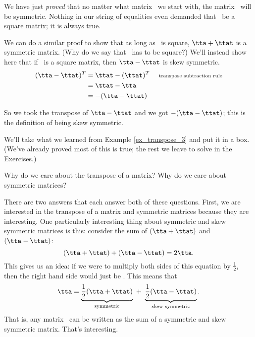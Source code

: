 We have just \textit{proved} that no matter what matrix \tta\ we start with, the matrix \tta\ttat\ will be symmetric. Nothing in our string of equalities even demanded that \tta\ be a square matrix; it is always true. 

We can do a similar proof to show that as long as \tta\ is square, $\tta+\ttat$ is a symmetric matrix. (Why do we say that \tta\ has to be square?) We'll instead show here that if \tta\ is a square matrix, then $\tta-\ttat$ is skew symmetric.
\begin{align*} 
(\tta-\ttat)^T &= \ttat - (\ttat)^T	\quad\ \text{\scriptsize transpose subtraction rule} \\
		&= \ttat - \tta \\
		&= -(\tta - \ttat)
\end{align*}

So we took the transpose of $\tta - \ttat$ and we got $-(\tta-\ttat)$; this is the definition of being skew symmetric.

We'll take what we learned from Example \ref{ex_transpose_3} and put it in a box. (We've already proved most of this is true; the rest we leave to solve in the Exercises.)

\smallskip


\smallskip
	
Why do we care about the transpose of a matrix? Why do we care about symmetric matrices?

There are two answers that each answer both of these questions. First, we are interested in the transpose of a matrix and symmetric matrices because they are interesting. One particularly interesting thing about symmetric and skew symmetric matrices is this: consider the sum of $(\tta+\ttat)$ and $(\tta-\ttat)$:
\[
(\tta+\ttat)+(\tta-\ttat) = 2\tta.
\]
This gives us an idea: if we were to multiply both sides of this equation by $\frac12$, then the right hand side would just be \tta. This means that 
\[
\tta = \underbrace{\frac12(\tta+\ttat)}_{\text{\centering \scriptsize symmetric}}\ +\ \underbrace{\frac12(\tta-\ttat)}_{\text{\centering\scriptsize skew symmetric}}.
\]
That is, any matrix \tta\ can be written as the sum of a symmetric and skew symmetric matrix. That's interesting.
 
